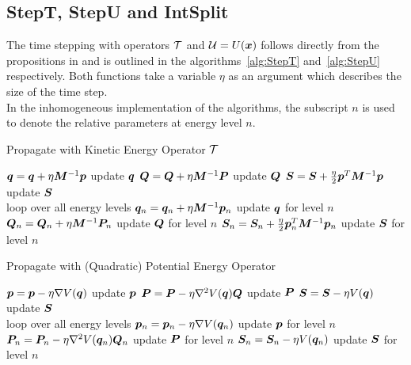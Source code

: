 \subsection{StepT, StepU and IntSplit}
\label{subsec:tuintsplit}
%
The time stepping with operators $\mathcal{T}$ and $\mathcal{U} = U(\bm{x})$ follows directly from the propositions in \cite{FGL_semiclassical_dynamics} and is outlined in the algorithms~\ref{alg:StepT} and~\ref{alg:StepU} respectively.
Both functions take a variable $\eta$ as an argument which describes the size of the time step. \\
In the inhomogeneous implementation of the algorithms, the subscript $n$ is used to denote the relative parameters at energy level $n$.
\par\medskip
%
\begin{algorithm}[h]
	\caption{Propagate with Kinetic Energy Operator $\mathcal{T}$}
	\label{alg:StepT}
	\begin{algorithmic}
	\State
		\State
		\State $\bm{q} = \bm{q} + \eta \bm{M}^{-1} \bm{p}$
		\Comment update $\bm{q}$
		\State $\bm{Q} = \bm{Q} + \eta \bm{M}^{-1} \bm{P}$
		\Comment update $\bm{Q}$
		\State $\bm{S} = \bm{S} + \frac{\eta}{2} \bm{p}^T \bm{M}^{-1} \bm{p}$
		\Comment update $\bm{S}$
		\State
	\EndProcedure
		\\\hrulefill
	\State
		\State
		\Comment loop over all energy levels
			\State $\bm{q}_n = \bm{q}_n + \eta \bm{M}^{-1} \bm{p}_n$
			\Comment update $\bm{q}$ for level $n$
			\State $\bm{Q}_n = \bm{Q}_n + \eta \bm{M}^{-1} \bm{P}_n$
			\Comment update $\bm{Q}$ for level $n$
			\State $\bm{S}_n = \bm{S}_n + \frac{\eta}{2} \bm{p}_n^T \bm{M}^{-1} \bm{p}_n$
			\Comment update $\bm{S}$ for level $n$
		\EndFor
		\State
	\EndProcedure
	\end{algorithmic}
\end{algorithm}
%
\begin{algorithm}[h]
	\caption{Propagate with (Quadratic) Potential Energy Operator}
	\label{alg:StepU}
	\begin{algorithmic}
	\State
		\Procedure{StepU[homogeneous]}{$\eta$}
		\State
		\State $\bm{p} = \bm{p} - \eta \nabla V (\bm{q})$
		\Comment update $\bm{p}$
		\State $\bm{P} = \bm{P} - \eta \nabla^2 V (\bm{q}) \bm{Q}$
		\Comment update $\bm{P}$
		\State $\bm{S} = \bm{S} - \eta V (\bm{q})$
		\Comment update $\bm{S}$
		\State
	\EndProcedure
		\\\hrulefill
	\State
		\Procedure{StepU[inhomogeneous]}{$\eta$}
		\State
		\For{$n=1,...,N$}
		\Comment loop over all energy levels
			\State $\bm{p}_n = \bm{p}_n - \eta \nabla V (\bm{q}_n)$
			\Comment update $\bm{p}$ for level $n$
			\State $\bm{P}_n = \bm{P}_n - \eta \nabla^2 V (\bm{q}_n) \bm{Q}_n$
			\Comment update $\bm{P}$ for level $n$
			\State $\bm{S}_n = \bm{S}_n - \eta V (\bm{q}_n)$
			\Comment update $\bm{S}$ for level $n$
		\EndFor
		\State
	\EndProcedure
	\end{algorithmic}
\end{algorithm}
